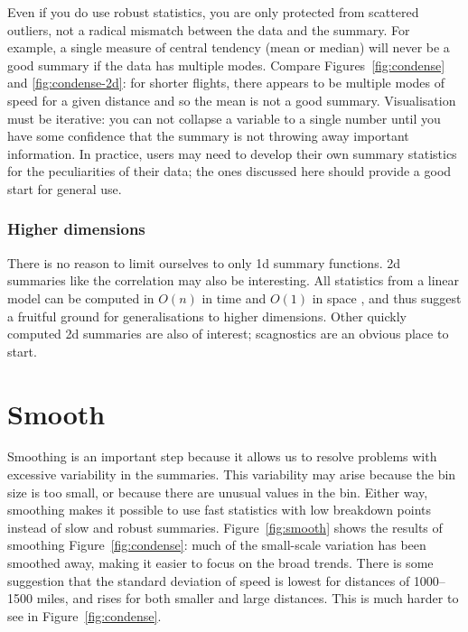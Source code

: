 \documentclass[journal]{vgtc}                %
\begin{document}
Even if you do use robust statistics, you are only protected from scattered outliers, not a radical mismatch between the data and the summary. For example, a single measure of central tendency (mean or median) will never be a good summary if the data has multiple modes. Compare Figures~\ref{fig:condense} and \ref{fig:condense-2d}: for shorter flights, there appears to be multiple modes of speed for a given distance and so the mean is not a good summary. Visualisation must be iterative: you can not collapse a variable to a single number until you have some confidence that the summary is not throwing away important information. In practice, users may need to develop their own summary statistics for the peculiarities of their data; the ones discussed here should provide a good start for general use.

\subsubsection{Higher dimensions}

There is no reason to limit ourselves to only 1d summary functions. 2d summaries like the correlation may also be interesting. All statistics from a linear model can be computed in $O(n)$ in time and $O(1)$ in space \citep{miller:1992}, and thus suggest a fruitful ground for generalisations to higher dimensions. Other quickly computed 2d summaries are also of interest; scagnostics \citep{wilkinson:2005} are an obvious place to start.

\section{Smooth}
\label{sec:smooth}

Smoothing is an important step because it allows us to resolve problems with excessive variability in the summaries. This variability may arise because the bin size is too small, or because there are unusual values in the bin. Either way, smoothing makes it possible to use fast statistics with low breakdown points instead of slow and robust summaries. Figure~\ref{fig:smooth} shows the results of smoothing Figure~\ref{fig:condense}: much of the small-scale variation has been smoothed away, making it easier to focus on the broad trends. There is some suggestion that the standard deviation of speed is lowest for distances of 1000--1500 miles, and rises for both smaller and large distances. This is much harder to see in Figure~\ref{fig:condense}.
\end{document}
